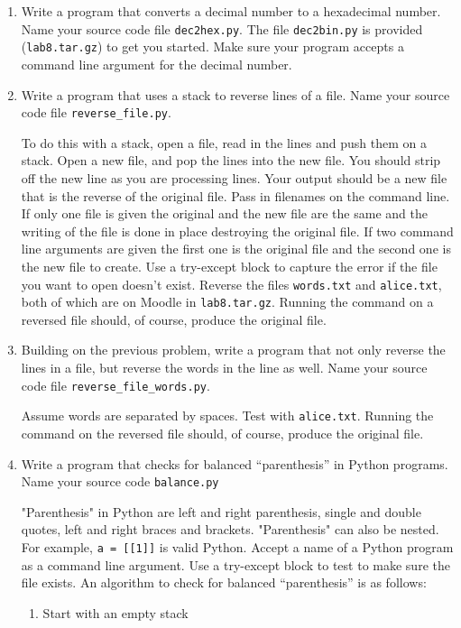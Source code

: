 \documentclass[12pt]{article}
\begin{document}
\begin{enumerate}
  \item Write a program that converts a decimal number to a hexadecimal number. Name your source code file \texttt{dec2hex.py}. The file \texttt{dec2bin.py} is provided (\texttt{lab8.tar.gz}) to get you started. Make sure your program accepts a command line argument for the decimal number.

  \item Write a program that uses a stack to reverse lines of a file. Name your source code file \texttt{reverse\_file.py}.
    
    To do this with a stack, open a file, read in the lines and push them on a stack. Open a new file, and pop the lines into the new file. You should strip off the new line as you are processing lines. Your output should be a new file that is the reverse of the original file. Pass in filenames on the command line. If only one file is given the original and the new file are the same and the writing of the file is done in place destroying the original file. If two command line arguments are given the first one is the original file and the second one is the new file to create. Use a try-except block to capture the error if the file you want to open doesn't exist. Reverse the files \texttt{words.txt} and \texttt{alice.txt}, both of which are on Moodle in \texttt{lab8.tar.gz}.  Running the command on a reversed file should, of course, produce the original file.

\item Building on the previous problem, write a program that not only reverse the lines in a file, but reverse the words in the line as well. Name your source code file \texttt{reverse\_file\_words.py}.  
  
Assume words are separated by spaces. Test with \texttt{alice.txt}. Running the command on the reversed file should, of course, produce the original file.

\item Write a program that checks for balanced ``parenthesis'' in Python programs. Name your source code \texttt{balance.py}

  "Parenthesis" in Python are left and right parenthesis, single and double quotes, left and right braces and brackets. "Parenthesis" can also be nested. For example, \texttt{a = [[1]]} is valid Python.  Accept a name of a Python program as a command line argument. Use a try-except block to test to make sure the file exists. 
An algorithm to check for balanced ``parenthesis'' is as follows:
\begin{enumerate}
  \item Start with an empty stack


\end{enumerate}
\end{enumerate}
\end{document}
